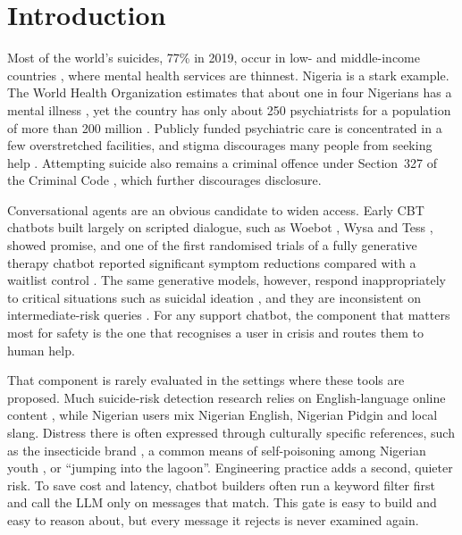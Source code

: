 \section{Introduction}

Most of the world's suicides, 77\% in 2019, occur in low- and middle-income countries \citep{who2021suicide}, where mental health services are thinnest. Nigeria is a stark example. The World Health Organization estimates that about one in four Nigerians has a mental illness \citep{soroye2021community}, yet the country has only about 250 psychiatrists for a population of more than 200 million \citep{fadele2024nigeria}. Publicly funded psychiatric care is concentrated in a few overstretched facilities, and stigma discourages many people from seeking help \citep{soroye2021community}. Attempting suicide also remains a criminal offence under Section~327 of the Criminal Code \citep{nigeria_criminal_code}, which further discourages disclosure.

Conversational agents are an obvious candidate to widen access. Early CBT chatbots built largely on scripted dialogue, such as Woebot \citep{fitzpatrick2017woebot}, Wysa \citep{inkster2018wysa} and Tess \citep{fulmer2018tess}, showed promise, and one of the first randomised trials of a fully generative therapy chatbot reported significant symptom reductions compared with a waitlist control \citep{heinz2025therabot}. The same generative models, however, respond inappropriately to critical situations such as suicidal ideation \citep{moore2025stigma}, and they are inconsistent on intermediate-risk queries \citep{mcbain2025alignment}. For any support chatbot, the component that matters most for safety is the one that recognises a user in crisis and routes them to human help.

That component is rarely evaluated in the settings where these tools are proposed. Much suicide-risk detection research relies on English-language online content \citep{ji2021sid}, while Nigerian users mix Nigerian English, Nigerian Pidgin and local slang. Distress there is often expressed through culturally specific references, such as the insecticide brand , a common means of self-poisoning among Nigerian youth \citep{ajayeoba2023sniper}, or ``jumping into the lagoon''. Engineering practice adds a second, quieter risk. To save cost and latency, chatbot builders often run a keyword filter first and call the LLM only on messages that match. This gate is easy to build and easy to reason about, but every message it rejects is never examined again.

